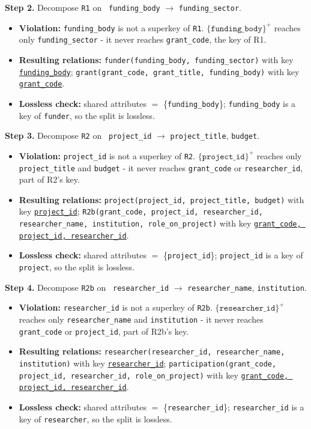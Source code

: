 \documentclass[11pt, letterpaper]{article}
\newcommand{\attr}[1]{\texttt{#1}}
\newcommand{\fd}{\ensuremath{\rightarrow}}
\newcommand{\clo}[1]{\ensuremath{\{#1\}^{+}}}
\newcommand{\pk}[1]{\underline{\texttt{#1}}}          %
\begin{document}
\textbf{Step 2.} Decompose \attr{R1} on \ \attr{funding\_body} \fd{} \attr{funding\_sector}.
\begin{itemize}
  \item \textbf{Violation:} \attr{funding\_body} is not a superkey of \attr{R1}. $\clo{\attr{funding\_body}}$ reaches only \attr{funding\_sector} - it never reaches \attr{grant\_code}, the key of R1.
  \item \textbf{Resulting relations:}
    \attr{funder(funding\_body, funding\_sector)} with key \pk{funding\_body}; \quad
    \attr{grant(grant\_code, grant\_title, funding\_body)} with key \pk{grant\_code}.
  \item \textbf{Lossless check:} shared attributes $=$ \{\attr{funding\_body}\}; \attr{funding\_body} is a key of \attr{funder}, so the split is lossless.
\end{itemize}

\textbf{Step 3.} Decompose \attr{R2} on \ \attr{project\_id} \fd{} \attr{project\_title}, \attr{budget}.
\begin{itemize}
  \item \textbf{Violation:} \attr{project\_id} is not a superkey of \attr{R2}. $\clo{\attr{project\_id}}$ reaches only \attr{project\_title} and \attr{budget} - it never reaches \attr{grant\_code} or \attr{researcher\_id}, part of R2's key.
  \item \textbf{Resulting relations:}
    \attr{project(project\_id, project\_title, budget)} with key \pk{project\_id}; \quad
    \attr{R2b(grant\_code, project\_id, researcher\_id, researcher\_name, institution, role\_on\_project)} with key \pk{grant\_code, project\_id, researcher\_id}.
  \item \textbf{Lossless check:} shared attributes $=$ \{\attr{project\_id}\}; \attr{project\_id} is a key of \attr{project}, so the split is lossless.
\end{itemize}

\textbf{Step 4.} Decompose \attr{R2b} on \ \attr{researcher\_id} \fd{} \attr{researcher\_name}, \attr{institution}.
\begin{itemize}
  \item \textbf{Violation:} \attr{researcher\_id} is not a superkey of \attr{R2b}. $\clo{\attr{researcher\_id}}$ reaches only \attr{researcher\_name} and \attr{institution} - it never reaches \attr{grant\_code} or \attr{project\_id}, part of R2b's key.
  \item \textbf{Resulting relations:}
    \attr{researcher(researcher\_id, researcher\_name, institution)} with key \pk{researcher\_id}; \quad
    \attr{participation(grant\_code, project\_id, researcher\_id, role\_on\_project)} with key \pk{grant\_code, project\_id, researcher\_id}.
  \item \textbf{Lossless check:} shared attributes $=$ \{\attr{researcher\_id}\}; \attr{researcher\_id} is a key of \attr{researcher}, so the split is lossless.
\end{itemize}
\end{document}
